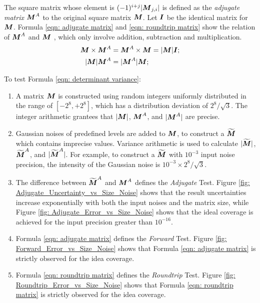 \documentclass[twoside]{article}
\numberwithin{equation}{section}
\begin{document}
The square matrix whose element is $(-1)^{i+j}|\protect{\textrm{\boldmath $M$}}_{j,i}|$ is defined as the \emph{adjugate matrix} \cite{Linear_Algebra} $\protect{\textrm{\boldmath $M$}}^A$ to the original square matrix $\protect{\textrm{\boldmath $M$}}$.
Let $\protect{\textrm{\boldmath $I$}}$ be the identical matrix for $\protect{\textrm{\boldmath $M$}}$.
Formula \eqref{eqn: adjugate matrix} and \eqref{eqn: roundtrip matrix} show the relation of $\protect{\textrm{\boldmath $M$}}^A$ and $\protect{\textrm{\boldmath $M$}}$ \cite{Linear_Algebra}, which only involve addition, subtraction and multiplication.
\begin{align}
\label{eqn: adjugate matrix}
\protect{\textrm{\boldmath $M$}} \times \protect{\textrm{\boldmath $M$}}^A &= \protect{\textrm{\boldmath $M$}}^A \times \protect{\textrm{\boldmath $M$}} = |\protect{\textrm{\boldmath $M$}}| \protect{\textrm{\boldmath $I$}}; \\
\label{eqn: roundtrip matrix}
|\protect{\textrm{\boldmath $M$}}| \protect{\textrm{\boldmath $M$}}^A &=|\protect{\textrm{\boldmath $M$}}^A| \protect{\textrm{\boldmath $M$}};
\end{align}

To test Formula \eqref{eqn: determinant variance}:
\begin{enumerate}
\item A matrix $\protect{\textrm{\boldmath $M$}}$ is constructed using random integers uniformly distributed in the range of $[-2^8, +2^8]$, which has a distribution deviation of $2^8/\sqrt{3}$.
The integer arithmetic grantees that $|\protect{\textrm{\boldmath $M$}}|$, $\protect{\textrm{\boldmath $M$}}^A$, and $|\protect{\textrm{\boldmath $M$}}^A|$ are precise.

\item Gaussian noises of predefined levels are added to $\protect{\textrm{\boldmath $M$}}$, to construct a $\widetilde{\protect{\textrm{\boldmath $M$}}}$ which contains imprecise values.
Variance arithmetic is used to calculate $|\widetilde{\protect{\textrm{\boldmath $M$}}}|$, $\widetilde{\protect{\textrm{\boldmath $M$}}}^A$, and $|\widetilde{\protect{\textrm{\boldmath $M$}}}^A|$.
For example, to construct a $\widetilde{\protect{\textrm{\boldmath $M$}}}$ with $10^{-3}$ input noise precision, the intensity of the Gaussian noise is $10^{-3} \times 2^8/\sqrt{3}$.

\item The difference between $\widetilde{\protect{\textrm{\boldmath $M$}}}^A$ and $\protect{\textrm{\boldmath $M$}}^A$ defines the \emph{Adjugate} Test.
Figure \ref{fig: Adjugate_Uncertainty_vs_Size_Noise} shows that the result uncertainties increase exponentially with both the input noises and the matrix size, while Figure \ref{fig: Adjugate_Error_vs_Size_Noise} shows that the ideal coverage is achieved for the input precision greater than $10^{-16}$.

\item Formula \eqref{eqn: adjugate matrix} defines the \emph{Forward} Test.
Figure \ref{fig: Forward_Error_vs_Size_Noise} shows that Formula \eqref{eqn: adjugate matrix} is strictly observed for the idea coverage.

\item Formula \eqref{eqn: roundtrip  matrix} defines the \emph{Roundtrip} Test.
Figure \ref{fig: Roundtrip_Error_vs_Size_Noise} shows that Formula \eqref{eqn: roundtrip matrix} is strictly observed for the idea coverage.

\end{enumerate}
\end{document}

